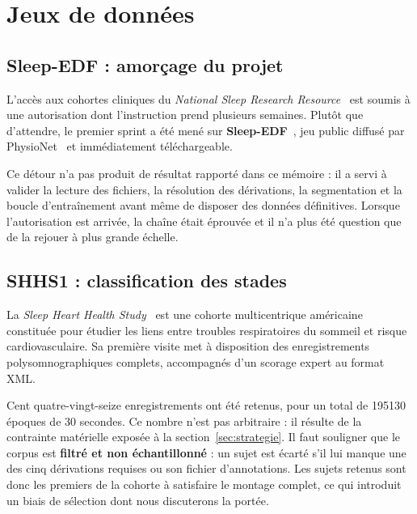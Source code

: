 \section{Jeux de données}

\subsection{Sleep-EDF : amorçage du projet}

L'accès aux cohortes cliniques du \emph{National Sleep Research
Resource}~\cite{zhang2018nsrr} est soumis à une autorisation dont l'instruction prend
plusieurs semaines. Plutôt que d'attendre, le premier sprint a été mené sur
\textbf{Sleep-EDF}~\cite{kemp2000}, jeu public diffusé par PhysioNet~\cite{goldberger2000}
et immédiatement téléchargeable.

Ce détour n'a pas produit de résultat rapporté dans ce mémoire : il a servi à valider
la lecture des fichiers, la résolution des dérivations, la segmentation et la boucle
d'entraînement avant même de disposer des données définitives. Lorsque l'autorisation
est arrivée, la chaîne était éprouvée et il n'a plus été question que de la rejouer à
plus grande échelle.

\subsection{SHHS1 : classification des stades}

La \emph{Sleep Heart Health Study}~\cite{quan1997} est une cohorte multicentrique
américaine constituée pour étudier les liens entre troubles respiratoires du sommeil
et risque cardiovasculaire. Sa première visite met à disposition des enregistrements
polysomnographiques complets, accompagnés d'un scorage expert au format XML.

Cent quatre-vingt-seize enregistrements ont été retenus, pour un total de
\num{195130} époques de 30 secondes. Ce nombre n'est pas arbitraire : il résulte de la
contrainte matérielle exposée à la section~\ref{sec:strategie}. Il faut souligner que
le corpus est \textbf{filtré et non échantillonné} : un sujet est écarté s'il lui
manque une des cinq dérivations requises ou son fichier d'annotations. Les sujets
retenus sont donc les premiers de la cohorte à satisfaire le montage complet, ce qui
introduit un biais de sélection dont nous discuterons la portée.

